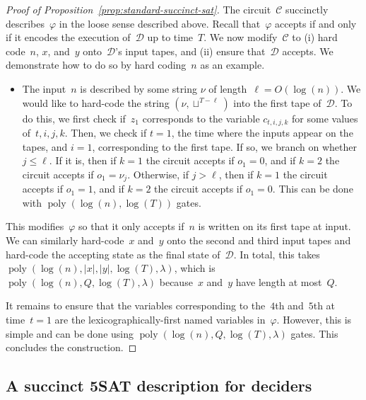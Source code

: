 \documentclass[11pt]{article}
\theoremstyle{definition}
\DeclareMathOperator{\poly}{poly}
\newcommand{\decider}{\mathcal{D}}
\newcommand{\circuit}{\mathcal{C}}
\begin{document}
\begin{proof}[Proof of Proposition~\ref{prop:standard-succinct-sat}]
The circuit~$\circuit$ succinctly describes~$\varphi$ in the loose sense
described above.
Recall that~$\varphi$ accepts if and only if it encodes the execution
of~$\decider$ up to time~$T$.
We now modify~$\circuit$ to (i) hard code~$n$, $x$, and~$y$ onto~$\decider$'s
input tapes, and (ii) ensure that~$\decider$ accepts.
We demonstrate how to do so by hard coding~$n$ as an example.
\begin{itemize}
\item The input~$n$ is described by some string $\nu$ of length~$\ell =
  O(\log(n))$.
	We would like to hard-code the string $(\nu, \sqcup^{T - \ell})$ into the
  first tape of~$\decider$.
	To do this, we first check if~$z_1$ corresponds to the variable $c_{t, i, j,
    k}$ for some values of~$t, i, j, k$.
	Then, we check if $t = 1$, the time where the inputs appear on the tapes, and
  $i = 1$, corresponding to the first tape.
	If so, we branch on whether $j \leq \ell$.
	If it is, then if $k = 1$ the circuit accepts if $o_1 = 0$, and if $k = 2$ the
  circuit accepts if $o_1 = \nu_j$.
	Otherwise, if $j > \ell$, then if $k = 1$ the circuit accepts if $o_1 = 1$,
  and if $k = 2$ the circuit accepts if $o_1 = 0$.
	This can be done with $\poly(\log(n), \log(T))$ gates.
\end{itemize}
This modifies~$\varphi$ so that it only accepts if~$n$ is written on its first
tape at input.
We can similarly hard-code~$x$ and~$y$ onto the second and third input tapes and
hard-code the accepting state as the final state of~$\decider$.
In total, this takes $\poly(\log(n), |x|, |y|, \log(T), \lambda)$, which is
$\poly(\log(n), Q, \log(T), \lambda)$ because~$x$ and~$y$ have length at
most~$Q$.

It remains to ensure that the variables corresponding to the~$4$th and~$5$th at
time~$t = 1$ are the lexicographically-first named variables in~$\varphi$.
However, this is simple and can be done using $\poly(\log(n), Q, \log(T),
\lambda)$ gates.
This concludes the construction.
\end{proof}

\subsection{A succinct 5SAT description for deciders}
\label{sec:succinct-deciders}
\end{document}
